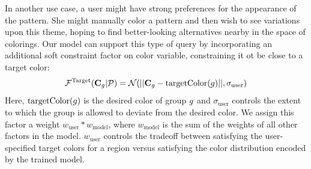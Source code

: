 In another use case, a user might have strong preferences for the appearance of the pattern. She might manually color a pattern and then wish to see variations upon this theme, hoping to find better-looking alternatives nearby in the space of colorings. Our model can support this type of query by incorporating an additional soft constraint factor on color variable, constraining it ot be close to a target color:
\begin{equation}
\mathcal{F}^\textrm{Target}(\mathbf{C}_g | \mathcal{P}) = \mathcal{N}(||\mathbf{C}_g - \textrm{targetColor}(g)||, \sigma_\textrm{user})
\label{eq:targetFactor}
\end{equation}
Here, $\textrm{targetColor}(g)$ is the desired color of group $g$ and $\sigma_\textrm{user}$ controls the extent to which the group is allowed to deviate from the desired color. We assign this factor a weight $w_\textrm{user} * w_\textrm{model}$, where $w_\textrm{model}$ is the sum of the weights of all other factors in the model. $w_\textrm{user}$ controls the tradeoff between satisfying the user-specified target colors for a region versus satisfying the color distribution encoded by the trained model.
%



